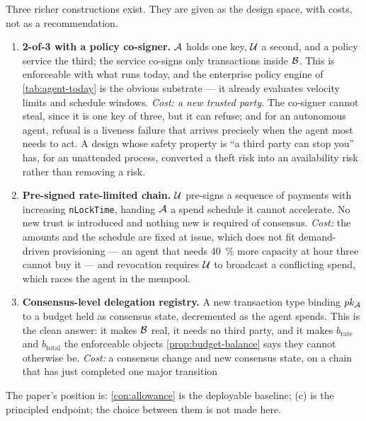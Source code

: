 Three richer constructions exist. They are given as the design space, with costs, not as a
recommendation.

\begin{enumerate}
  \item \textbf{2-of-3 with a policy co-signer.} $\mathcal{A}$ holds one key, $\mathcal{U}$ a second, and a
  policy service the third; the service co-signs only transactions inside $\mathcal{B}$. This is
  enforceable with what runs today, and the enterprise policy engine of \cref{tab:agent-today} is the
  obvious substrate --- it already evaluates velocity limits and schedule windows. \emph{Cost: a new
  trusted party.} The co-signer cannot steal, since it is one key of three, but it can refuse; and for
  an autonomous agent, refusal is a liveness failure that arrives precisely when the agent most needs
  to act. A design whose safety property is ``a third party can stop you'' has, for an unattended
  process, converted a theft risk into an availability risk rather than removing a risk.
  \item \textbf{Pre-signed rate-limited chain.} $\mathcal{U}$ pre-signs a sequence of payments with
  increasing \texttt{nLockTime}, handing $\mathcal{A}$ a spend schedule it cannot accelerate. No new trust
  is introduced and nothing new is required of consensus. \emph{Cost:} the amounts and the schedule
  are fixed at issue, which does not fit demand-driven provisioning --- an agent that needs
  \SI{40}{\percent} more capacity at hour three cannot buy it --- and revocation requires
  $\mathcal{U}$ to broadcast a conflicting spend, which races the agent in the mempool.
  \item \textbf{Consensus-level delegation registry.} A new transaction type binding $pk_{\mathcal{A}}$ to a
  budget held as consensus state, decremented as the agent spends. This is the clean answer: it makes
  $\mathcal{B}$ real, it needs no third party, and it makes $b_{\mathrm{rate}}$ and $b_{\mathrm{total}}$
  the enforceable objects \cref{prop:budget-balance} says they cannot otherwise be. \emph{Cost:} a
  consensus change and new consensus state, on a chain that has just completed one major transition
\end{enumerate}

The paper's position is: \cref{con:allowance} is the deployable baseline; (c) is the principled
endpoint; the choice between them is not made here.

